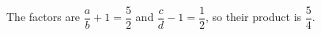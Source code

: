 The factors are $\dfrac{a}{b}+1=\dfrac{5}{2}$ and $\dfrac{c}{d}-1=\dfrac{1}{2}$, so their product is $\boxed{\dfrac{5}{4}}$.
